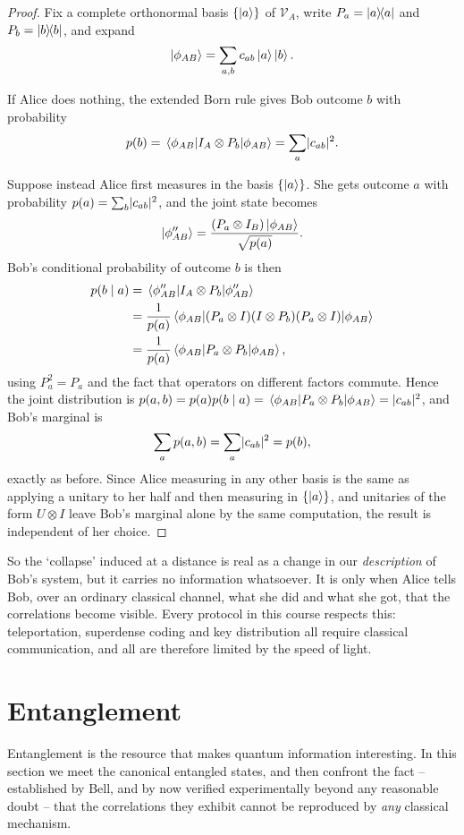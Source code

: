 \documentclass[a4paper]{scrartcl}
\newcommand{\Vs}{\mathcal{V}}
\begin{document}
\begin{proof}
	Fix a complete orthonormal basis $\{\ket{a}\}$ of $\Vs_A$, write $P_a = \op{a}{a}$ and $P_b = \op{b}{b}$, and expand
	$$\ket{\phi_{AB}} = \sum_{a,b} c_{ab}\ket{a}\ket{b}.$$

	If Alice does nothing, the extended Born rule gives Bob outcome $b$ with probability
	$$p(b) = \mel{\phi_{AB}}{I_A\otimes P_b}{\phi_{AB}} = \sum_a \lvert c_{ab}\rvert^2.$$

	Suppose instead Alice first measures in the basis $\{\ket{a}\}$. She gets outcome $a$ with probability $p(a) = \sum_b\lvert c_{ab}\rvert^2$, and the joint state becomes
	$$\ket{\phi''_{AB}} = \frac{(P_a\otimes I_B)\ket{\phi_{AB}}}{\sqrt{p(a)}}.$$
	Bob's conditional probability of outcome $b$ is then
	\begin{align*}
		p(b \mid a) &= \mel{\phi''_{AB}}{I_A\otimes P_b}{\phi''_{AB}} \\
		&= \frac{1}{p(a)}\mel{\phi_{AB}}{(P_a\otimes I)(I\otimes P_b)(P_a\otimes I)}{\phi_{AB}} \\
		&= \frac{1}{p(a)}\mel{\phi_{AB}}{P_a\otimes P_b}{\phi_{AB}},
	\end{align*}
	using $P_a^2 = P_a$ and the fact that operators on different factors commute. Hence the joint distribution is $p(a,b) = p(a)p(b\mid a) = \mel{\phi_{AB}}{P_a\otimes P_b}{\phi_{AB}} = \lvert c_{ab}\rvert^2$, and Bob's marginal is
	$$\sum_a p(a,b) = \sum_a \lvert c_{ab}\rvert^2 = p(b),$$
	exactly as before. Since Alice measuring in any other basis is the same as applying a unitary to her half and then measuring in $\{\ket{a}\}$, and unitaries of the form $U \otimes I$ leave Bob's marginal alone by the same computation, the result is independent of her choice.
\end{proof}

So the `collapse' induced at a distance is real as a change in our \emph{description} of Bob's system, but it carries no information whatsoever. It is only when Alice tells Bob, over an ordinary classical channel, what she did and what she got, that the correlations become visible. Every protocol in this course respects this: teleportation, superdense coding and key distribution all require classical communication, and all are therefore limited by the speed of light.

\section{Entanglement}\label{sec:entanglement}

Entanglement is the resource that makes quantum information interesting. In this section we meet the canonical entangled states, and then confront the fact -- established by Bell, and by now verified experimentally beyond any reasonable doubt -- that the correlations they exhibit cannot be reproduced by \emph{any} classical mechanism.
\end{document}
